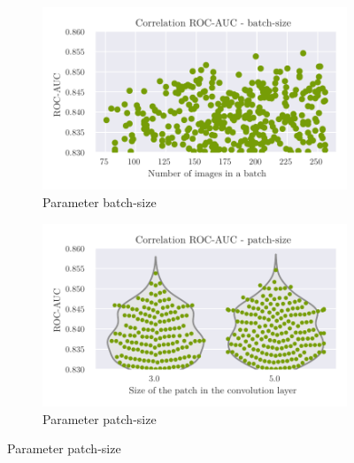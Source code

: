 \begin{figure}
\centering
\begin{subfigure}{.5\textwidth}
  \centering
  \includegraphics[scale=0.55]{Plots/Best_Hyperparameter_Batch_Size.pdf}
  \caption{Parameter batch-size}
  \label{fig:batch_size}
\end{subfigure}%
\begin{subfigure}{.5\textwidth}
  \centering
  \includegraphics[scale=0.55]{Plots/Best_Hyperparameter_Patch_Size.pdf}
  \caption{Parameter patch-size}
  \label{fig:patch_size}
\end{subfigure}


\end{figure}
